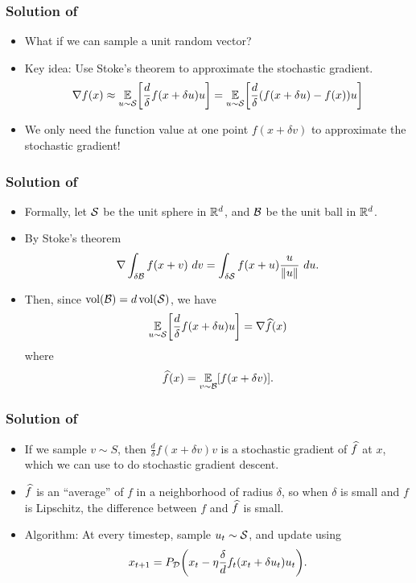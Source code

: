 \documentclass{beamer}
\begin{document}
\begin{frame}
    \frametitle{Solution of~\cite{flaxman2005online}}
    \begin{itemize}
        \item What if we can sample a unit random vector?
        \item Key idea: Use Stoke's theorem to approximate the stochastic gradient.
        \[
            \nabla f(x) \approx \E_{u \sim \Sc}\bracks*{\frac{d}{\delta} f(x + \delta u) u} = \E_{u \sim \Sc}\bracks*{\frac{d}{\delta} (f(x + \delta u) - f(x)) u}
        \]
        \item We only need the function value at one point $f(x + \delta v)$ to approximate the stochastic gradient!
    \end{itemize}
\end{frame}
\begin{frame}
    \frametitle{Solution of~\cite{flaxman2005online}}
    \begin{itemize}
        \item Formally, let $\mathcal{S}$ be the unit sphere in $\mathbb{R}^d$, and $\mathcal{B}$ be the unit ball in $\mathbb{R}^d$.
        \item By Stoke's theorem
        \[
            \nabla \int_{\delta \mathcal{B}} f(x + v)~dv = \int_{\delta \mathcal{S}} f(x + u) \frac{u}{\lVert u\rVert}~du.
        \]
        \item Then, since $\operatorname{vol}(\mathcal{B}) = d\operatorname{vol}(\mathcal{S})$, we have
        \[
            \E_{u \sim \Sc}\bracks*{\frac{d}{\delta} f(x + \delta u) u} = 
            \nabla \wh{f}(x)
        \]
        where
        \[
            \widehat{f}(x) = \operatorname*{\mathbb{E}}_{v \sim \mathcal{B}}[f(x + \delta v)].
        \]
    \end{itemize}
\end{frame}
\begin{frame}
    \frametitle{Solution of~\cite{flaxman2005online}}
    \begin{itemize}
        \item If we sample $v \sim S$, then $\frac{d}{\delta} f(x + \delta v)v$ is a stochastic gradient of $\widehat{f}$ at $x$, which we can use to do stochastic gradient descent.
        \item $\widehat{f}$ is an ``average'' of $f$ in a neighborhood of radius $\delta$, so when $\delta$ is small and $f$ is Lipschitz, the difference between $f$ and $\widehat{f}$ is small.
        \item Algorithm: At every timestep, sample $u_t \sim \mathcal{S}$, and update using
        \[
            x_{t+1} = P_\Dc\parens*{x_t - \eta \frac{\delta}{d} f_t(x_t + \delta u_t)u_t}.
        \]
    \end{itemize}
\end{frame}
\end{document}
